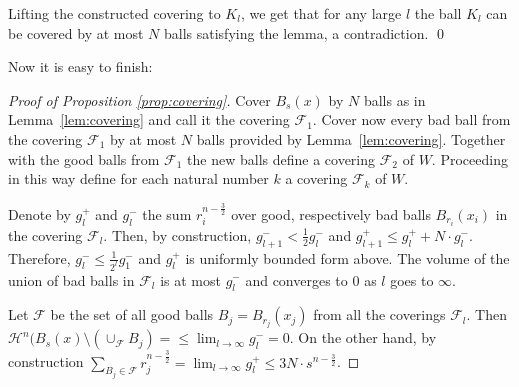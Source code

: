 \documentclass[12pt,leqno,intlimits]{amsart}
\numberwithin{equation}{section}
\theoremstyle{definition}
\theoremstyle{remark}
\newcommand{\lref}[1]{Lemma~\ref{#1}}
\def\qeds{\qed\par\medskip}
\begin{document}
Lifting the constructed covering to $K_l$,
we get that for any large $l$
the ball $K_l$ can be covered by at most $N$ balls satisfying the lemma,
a contradiction.
\qeds

Now it is easy to finish:
\begin{proof}[Proof of Proposition \ref{prop:covering}]
Cover $B_{s} (x)$ by $N$ balls as in \lref{lem:covering}  and call it the covering $\mathcal F_1$.  Cover now every bad
 ball from the covering $\mathcal F_1$ by at most $N$ balls provided by  \lref{lem:covering}. Together with the good balls from $\mathcal F_1$ the new balls define a covering $\mathcal F_2$ of $W$. Proceeding in this way define for each natural number $k$ a covering $\mathcal F_k$ of $W$.

 Denote by $g_l^{+}$ and $g_l ^-$ the sum $r_i ^{n-\frac32}$ over good, respectively bad balls $B_{r_i} (x_i)$ in the covering $\mathcal F_l$.
 Then, by construction, $g_{l+1} ^- < \frac 1 2 g_l ^-$ and $g_{l+1} ^+ \leq g_l ^+ + N\cdot g_l ^-$. Therefore, $g_l^- \leq \frac 1 {2^l} g_1 ^-$
 and $g_l^+$ is uniformly bounded form above.
 The volume of the union of bad balls in $\mathcal F_l$ is at most $g_l^-$ and converges to $0$ as $l$ goes to $\infty$.

 Let  $\mathcal F$ be the set of all good balls $B_j =B_{r_j} (x_j)$ from all the  coverings $\mathcal F_l$.
   Then $\mathcal H^n (B_s (x) \setminus (\cup _{\mathcal F} B_j  )  = \leq  \lim _{l\to \infty} g_l ^- =0$.  On the other hand,
   by construction $\sum _{B_j\in \mathcal F} r_j^{n- \frac 3 2} = \lim _{l\to \infty} g_l^+  \leq  3N \cdot s^{n- \frac 3 2}$.
\end{proof}
\end{document}
